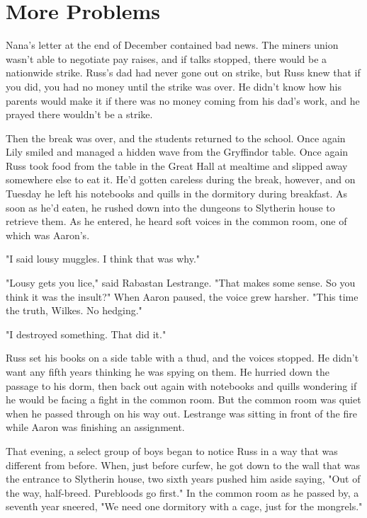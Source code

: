 
\chapter{More Problems}

Nana's letter at the end of December contained bad news. The miners union wasn't able to negotiate pay raises, and if talks stopped, there would be a nationwide strike. Russ's dad had never gone out on strike, but Russ knew that if you did, you had no money until the strike was over. He didn't know how his parents would make it if there was no money coming from his dad's work, and he prayed there wouldn't be a strike.

Then the break was over, and the students returned to the school. Once again Lily smiled and managed a hidden wave from the Gryffindor table. Once again Russ took food from the table in the Great Hall at mealtime and slipped away somewhere else to eat it. He'd gotten careless during the break, however, and on Tuesday he left his notebooks and quills in the dormitory during breakfast. As soon as he'd eaten, he rushed down into the dungeons to Slytherin house to retrieve them. As he entered, he heard soft voices in the common room, one of which was Aaron's.

"I said lousy muggles. I think that was why."

"Lousy gets you lice," said Rabastan Lestrange. "That makes some sense. So you think it was the insult?" When Aaron paused, the voice grew harsher. "This time the truth, Wilkes. No hedging."

"I destroyed something. That did it."

Russ set his books on a side table with a thud, and the voices stopped. He didn't want any fifth years thinking he was spying on them. He hurried down the passage to his dorm, then back out again with notebooks and quills wondering if he would be facing a fight in the common room. But the common room was quiet when he passed through on his way out. Lestrange was sitting in front of the fire while Aaron was finishing an assignment.

That evening, a select group of boys began to notice Russ in a way that was different from before. When, just before curfew, he got down to the wall that was the entrance to Slytherin house, two sixth years pushed him aside saying, "Out of the way, half-breed. Purebloods go first." In the common room as he passed by, a seventh year sneered, "We need one dormitory with a cage, just for the mongrels."

